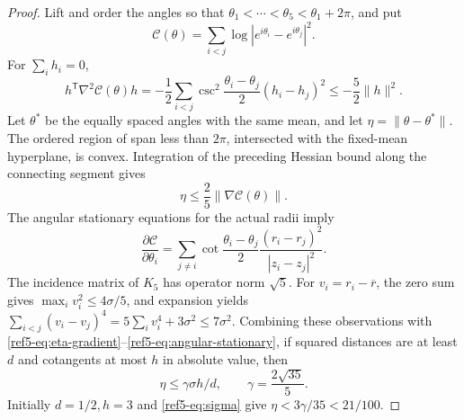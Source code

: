 \documentclass[11pt]{article}
\theoremstyle{remark}
\newcommand{\norm}[1]{\lVert#1\rVert}
\numberwithin{equation}{section}
\begin{document}
\begin{proof}
Lift and order the angles so that
$\theta_1<\cdots<\theta_5<\theta_1+2\pi$, and put
\[
 \mathcal C(\theta)=\sum_{i<j}
       \log|e^{i\theta_i}-e^{i\theta_j}|^2.
\]
For $\sum_i h_i=0$,
\[
 h^{\mathsf T}\nabla^2\mathcal C(\theta)h
 =-\frac12\sum_{i<j}
   \csc^2\frac{\theta_i-\theta_j}{2}(h_i-h_j)^2
 \le-\frac52\norm h^2.
\]
Let $\theta^*$ be the equally spaced angles with the same mean, and let
$\eta=\norm{\theta-\theta^*}$. The ordered region of span less than
$2\pi$, intersected with the fixed-mean hyperplane, is convex.
Integration of the preceding Hessian bound along the connecting segment
gives
\begin{equation}\label{ref5-eq:eta-gradient}
 \eta\le\frac25\norm{\nabla\mathcal C(\theta)}.
\end{equation}
The angular stationary equations for the actual radii imply
\begin{equation}\label{ref5-eq:angular-stationary}
 \frac{\partial\mathcal C}{\partial\theta_i}
 =\sum_{j\ne i}\cot\frac{\theta_i-\theta_j}{2}
       \frac{(r_i-r_j)^2}{|z_i-z_j|^2}.
\end{equation}
The incidence matrix of $K_5$ has operator norm $\sqrt5$.
For $v_i=r_i-\overline r$, the zero sum gives
$\max_i v_i^2\le4\sigma/5$, and expansion yields
$\sum_{i<j}(v_i-v_j)^4=5\sum_i v_i^4+3\sigma^2\le7\sigma^2$.
Combining these observations with
\eqref{ref5-eq:eta-gradient}--\eqref{ref5-eq:angular-stationary}, if squared
distances are at least $d$ and cotangents at most $h$ in absolute value,
then
\begin{equation}\label{ref5-eq:eta-basic}
 \eta\le\gamma\sigma h/d,\qquad \gamma=\frac{2\sqrt{35}}5.
\end{equation}
Initially $d=1/2,h=3$ and \eqref{ref5-eq:sigma} give
$\eta<3\gamma/35<21/100$.


\end{proof}
\end{document}
